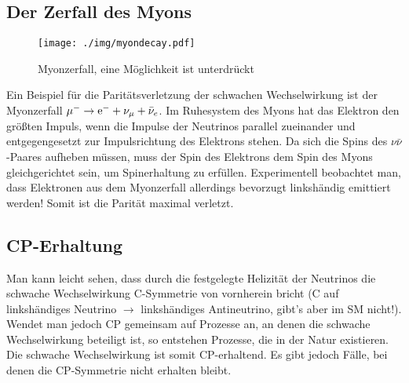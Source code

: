 \subsection{Der Zerfall des Myons}
\begin{figure}
	\centering
	\texttt{[image: ./img/myondecay.pdf]}
	\caption{Myonzerfall, eine Möglichkeit ist unterdrückt}
\end{figure}
Ein Beispiel für die Paritätsverletzung der schwachen Wechselwirkung ist der Myonzerfall $\mu^-\rightarrow\text{e}^- + \nu_\mu + \bar{\nu}_e$.
Im Ruhesystem des Myons hat das Elektron den größten Impuls, wenn die Impulse der Neutrinos parallel zueinander und entgegengesetzt zur Impulsrichtung des Elektrons stehen.
Da sich die Spins des $\nu\bar{\nu}$-Paares aufheben müssen, muss der Spin des Elektrons dem Spin des Myons gleichgerichtet sein, um Spinerhaltung zu erfüllen.
Experimentell beobachtet man, dass Elektronen aus dem Myonzerfall allerdings bevorzugt linkshändig emittiert werden!
Somit ist die Parität maximal verletzt.

\subsection{CP-Erhaltung}
Man kann leicht sehen, dass durch die festgelegte Helizität der Neutrinos die schwache Wechselwirkung C-Symmetrie von vornherein bricht (C auf linkshändiges Neutrino $\rightarrow$ linkshändiges Antineutrino, gibt's aber im SM nicht!).
Wendet man jedoch CP gemeinsam auf Prozesse an, an denen die schwache Wechselwirkung beteiligt ist, so entstehen Prozesse, die in der Natur existieren.
Die schwache Wechselwirkung ist somit CP-erhaltend.
Es gibt jedoch Fälle, bei denen die CP-Symmetrie nicht erhalten bleibt.
